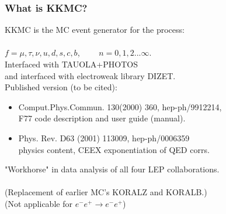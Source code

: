 \documentclass{beamer}
\newcommand{\cbl}{\color{blue}}
\newcommand{\cmg}{\color{magenta}}
\begin{document}
\begin{frame}[fragile]
\frametitle{\bf What is KKMC?}
{\large
KKMC is the MC event generator for the process:\\
~~~~~~~~~~~~~~\fbox{\cbl $e^-e^+ \to f\bar{f}+ n\gamma$}\\
{\cbl $f=\mu,\tau,\nu,u,d,s,c,b$,~~~~ $n=0,1,2...\infty$.}
}\\
Interfaced with TAUOLA+PHOTOS\\
and interfaced with electroweak library DIZET.\\

Published version \fbox{\cmg 4.13} (to be cited):
\begin{itemize}
\item
Comput.Phys.Commun. 130(2000) 360, hep-ph/9912214,\\
F77 code description and user guide (manual).
\item
Phys. Rev. D63 (2001) 113009, hep-ph/0006359\\
physics content, CEEX exponentiation of QED corrs.\\
\end{itemize}
"Workhorse" in data analysis of all four LEP collaborations.\\
~~~\\
\footnotesize
(Replacement of earlier MC's KORALZ and KORALB.)\\
(Not applicable for  $e^-e^+ \to e^-e^+$)

\end{frame}
\end{document}
